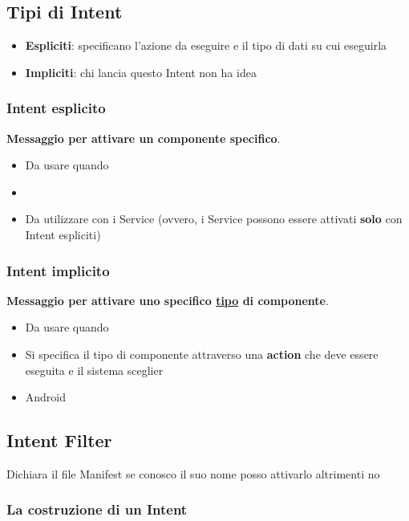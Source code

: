 \subsection{Tipi di Intent}
\par 
\begin{itemize}
    \item \textbf{Espliciti}: specificano l'azione da eseguire e il tipo di dati su cui eseguirla
    \item \textbf{Impliciti}: chi lancia questo Intent non ha idea
\end{itemize}

\subsubsection{Intent esplicito}
\par \textbf{Messaggio per attivare un componente specifico}.
\begin{itemize}
    \item Da usare quando
    \item 
    \item Da utilizzare con i Service (ovvero, i Service possono essere attivati \textbf{solo} con Intent espliciti)
\end{itemize}

\subsubsection{Intent implicito}
\par \textbf{Messaggio per attivare uno specifico \underline{tipo} di componente}.
\begin{itemize}
    \item Da usare quando
    \item Si specifica il tipo di componente attraverso una \textbf{action} che deve essere eseguita e il sistema sceglier
    \item Android
\end{itemize}

\subsection{Intent Filter}
Dichiara il file Manifest
se conosco il suo nome posso attivarlo altrimenti no

\subsubsection{La costruzione di un Intent}

